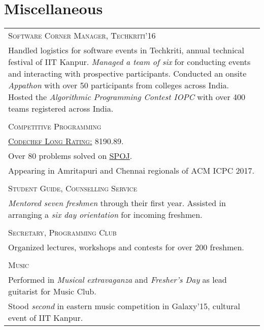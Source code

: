 \documentclass[a4paper,10pt]{article}
\begin{document}
\section{Miscellaneous}
\begin{longtable}{p{13cm}}
\large \textsc{Software Corner Manager, Techkriti'16}\\
Handled logistics for software events in Techkriti, annual technical festival of IIT Kanpur. \textit{Managed a team of six} for conducting events and interacting with prospective participants. Conducted an onsite \textit{Appathon} with over 50 participants from colleges across India. Hosted the \textit{Algorithmic Programming Contest IOPC} with over 400 teams registered across India.\\ \\
\large \textsc{Competitive Programming}\\
\href{https://www.codechef.com/users/architsh}{\textsc{Codechef Long Rating:}} 8190.89.\\
Over 80 problems solved on \href{http://www.spoj.com/users/architsh/}{SPOJ}.\\
Appearing in Amritapuri and Chennai regionals of ACM ICPC 2017.\\ \\
\large \textsc{Student Guide, Counselling Service}\\
\textit{Mentored seven freshmen} through their first year. Assisted in arranging a \textit{six day orientation} for incoming freshmen.\\ \\
\large \textsc{Secretary, Programming Club}\\
Organized lectures, workshops and contests for over 200 freshmen.
\\ \\
\large \textsc{Music}\\
Performed in \textit{Musical extravaganza} and \textit{Fresher's Day} as lead guitarist for Music Club.\\
Stood \textit{second} in eastern music competition in Galaxy'15, cultural event of IIT Kanpur.
\end{longtable}
\end{document}
